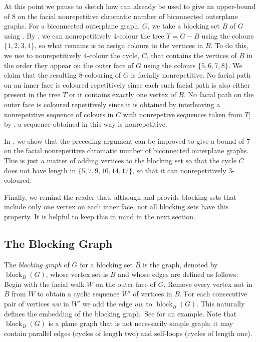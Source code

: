 \documentclass{patmorin}
\DeclareMathOperator{\block}{block}
\begin{document}
At this point we pause to sketch how 
can already be used to give an upper-bound of 8 on the facial
nonrepetitive chromatic number of biconnected outerplane graphs.  For a
biconnected outerplane graph, $G$, we take a blocking set $B$ of $G$
using .  By , we can nonrepetitively
4-colour the tree $T=G-B$ using the colours $\{1,2,3,4\}$, so
what remains is to assign colours to the vertices in $B$.  To do this,
we use  to nonrepetitively 4-colour the cycle, $C$, that
contains the vertices of $B$ in the order they appear on the outer face
of $G$ using the colours $\{5,6,7,8\}$.  We claim that the resulting
8-colouring of $G$ is facially nonrepetitive.  No facial path on an
inner face is coloured repetitively since each such facial path is also
either present in the tree $T$ or it contains exactly one vertex of $B$.
No facial path on the outer face is coloured repetitively since it is
obtained by interleaving a nonrepetitive sequence of colours in $C$
with nonrepetive sequences taken from $T$; by ,
a sequence obtained in this way is nonrepetitive.

In , we show that the preceding argument can be
improved to give a bound of 7 on the facial nonrepetitive chromatic
number of biconnected outerplane graphs. This is just a matter of adding
vertices to the blocking set so that the cycle $C$ does not have length
in $\{5,7,9,10,14,17\}$, so that it can nonrepetitively 3-coloured.

Finally, we remind the reader that, although  and
 provide blocking sets that include only one
vertex on each inner face, not all blocking sets have this property.
It is helpful to keep this in mind in the next section.

\subsection{The Blocking Graph}


The \emph{blocking graph} of $G$ for a blocking set $B$ is the graph,
denoted by $\block_B(G)$, whose vertex set is $B$ and whose edges are
defined as follows: Begin with the facial walk $W$ on the outer face
of $G$. Remove every vertex not in $B$ from $W$ to obtain a cyclic
sequence $W'$ of vertices in $B$. For each consecutive pair of vertices
$uw$ in $W'$ we add the edge $uw$ to $\block_B(G)$.  This naturally
defines the embedding of the blocking graph. See 
for an example.   Note that $\block_B(G)$ is a plane graph that is not
necessarily simple graph; it may contain parallel edges (cycles of length
two) and self-loops (cycles of length one).
\end{document}
